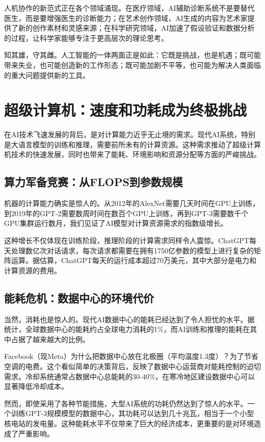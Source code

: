 人机协作的新范式正在各个领域涌现。在医疗领域，AI辅助诊断系统不是要替代医生，而是要增强医生的诊断能力；在艺术创作领域，AI生成的内容为艺术家提供了新的创作素材和灵感来源；在科学研究领域，AI加速了假设验证和数据分析的过程，让科学家能够专注于更高层次的理论思考。

知其雄，守其雌。人工智能的一体两面正是如此：它既是挑战，也是机遇；既可能带来失业，也可能创造新的工作形态；既可能加剧不平等，也可能为解决人类面临的重大问题提供新的工具。

\section{超级计算机：速度和功耗成为终极挑战}

在AI技术飞速发展的背后，是对计算能力近乎无止境的需求。现代AI系统，特别是大语言模型的训练和推理，需要前所未有的计算资源。这种需求推动了超级计算机技术的快速发展，同时也带来了能耗、环境影响和资源分配等方面的严峻挑战。

\subsection{算力军备竞赛：从FLOPS到参数规模}

机器的计算能力确实是惊人的。从2012年的AlexNet需要几天时间在GPU上训练，到2019年的GPT-2需要数周时间在数百个GPU上训练，再到GPT-3需要数千个GPU集群运行数月，我们见证了AI模型对计算资源需求的指数级增长。

这种增长不仅体现在训练阶段，推理阶段的计算需求同样令人震惊。ChatGPT每天处理数亿次对话请求，每次请求都需要在拥有1750亿参数的模型上进行复杂的矩阵运算。据估算，ChatGPT每天的运行成本超过70万美元，其中大部分是电力和计算资源的费用。

\subsection{能耗危机：数据中心的环境代价}

当然，消耗也是惊人的。现代AI数据中心的能耗已经达到了令人担忧的水平。据统计，全球数据中心的能耗约占全球电力消耗的1\%，而AI训练和推理的能耗在其中占据了越来越大的比例。

Facebook（现Meta）为什么把数据中心放在北极圈（平均温度1.3度）？为了节省空调的电费。这个看似简单的决策背后，反映了数据中心运营商对能耗控制的迫切需求。冷却系统通常占数据中心总能耗的30-40\%，在寒冷地区建设数据中心可以显著降低冷却成本。

然而，即使采用了各种节能措施，大型AI系统的功耗仍然达到了惊人的水平。一个训练GPT-3规模模型的数据中心，其功耗可以达到几十兆瓦，相当于一个小型核电站的发电量。这种能耗水平不仅带来了巨大的经济成本，更重要的是对环境造成了严重影响。

